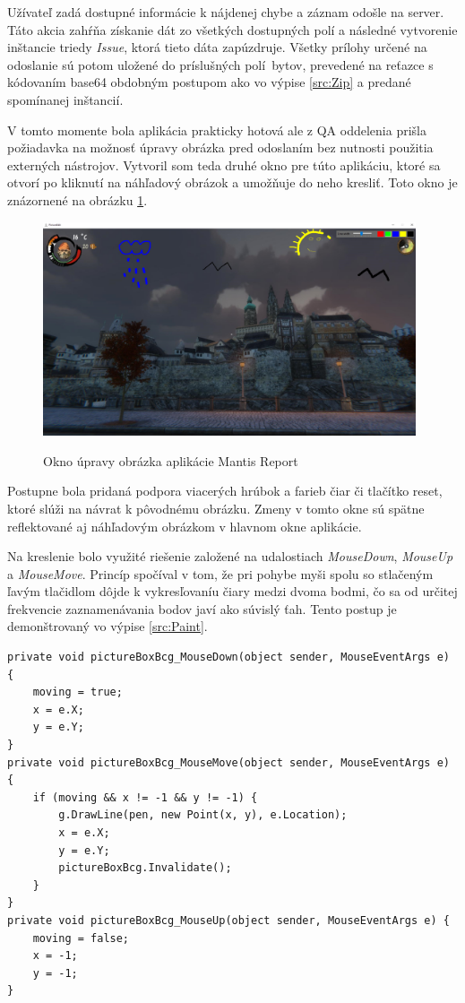 \documentclass[slovak, bachelorpractice]{diploma}
\begin{document}
Užívateľ zadá dostupné informácie k nájdenej chybe a záznam odošle na server. Táto akcia zahŕňa získanie dát zo všetkých dostupných polí a následné vytvorenie inštancie triedy \textit{Issue}, ktorá tieto dáta zapúzdruje. Všetky prílohy určené na odoslanie sú potom uložené do príslušných \mbox{polí bytov}, prevedené na reťazce s kódovaním base64 obdobným postupom ako vo výpise \ref{src:Zip} a predané spomínanej inštancií.

V tomto momente bola aplikácia prakticky hotová ale z QA oddelenia prišla požiadavka na možnosť úpravy obrázka pred odoslaním bez nutnosti použitia externých nástrojov. Vytvoril som teda druhé okno pre túto aplikáciu, ktoré sa otvorí po kliknutí na náhľadový obrázok a umožňuje do neho kresliť. Toto okno je znázornené na obrázku \ref{pic:Paint}. 

\begin{figure}[!htbp]
	\centering
	\mybox{} {
		\includegraphics[width=0.98\textwidth]{Pictures/pictureEditBox.png}
	}
	\caption{Okno úpravy obrázka aplikácie Mantis Report}
	\label{pic:Paint}
\end{figure}

Postupne bola pridaná podpora viacerých hrúbok a farieb čiar či tlačítko reset, ktoré slúži na návrat k pôvodnému obrázku. Zmeny v tomto okne sú spätne reflektované aj náhľadovým obrázkom v hlavnom okne aplikácie. 

Na kreslenie bolo využité riešenie založené na udalostiach \textit{MouseDown}, \textit{MouseUp} a \textit{MouseMove}. Princíp spočíval v tom, že pri pohybe myši spolu so stlačeným ľavým tlačidlom dôjde k vykresľovaníu čiary medzi dvoma bodmi, čo sa od určitej frekvencie zaznamenávania bodov javí ako súvislý ťah. Tento postup je demonštrovaný vo výpise \ref{src:Paint}.
\vspace{10pt}
\begin{lstlisting}[label=src:Paint,caption={Implementácia kreslenia v prostredí Windows Forms}]
private void pictureBoxBcg_MouseDown(object sender, MouseEventArgs e) {
    moving = true;
    x = e.X;
    y = e.Y;
}
private void pictureBoxBcg_MouseMove(object sender, MouseEventArgs e) {
    if (moving && x != -1 && y != -1) {
        g.DrawLine(pen, new Point(x, y), e.Location);
        x = e.X;
        y = e.Y;
        pictureBoxBcg.Invalidate();
    }
}
private void pictureBoxBcg_MouseUp(object sender, MouseEventArgs e) {
    moving = false;
    x = -1;
    y = -1;
}
\end{lstlisting}
\end{document}

